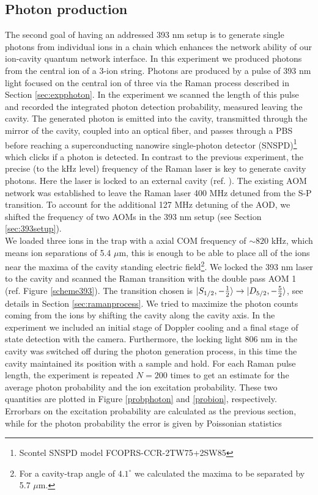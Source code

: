\subsection{Photon production}
\label{exp:photons}
The second goal of having an addressed 393 nm setup is to generate single photons from individual ions in a chain which enhances the network ability of our ion-cavity quantum network interface. In this experiment we produced photons from the central ion of a 3-ion string. Photons are produced by a pulse of 393 nm light focused on the central ion of three via the Raman process described in Section \ref{sec:expphoton}. In the experiment we scanned the length of this pulse and recorded the integrated photon detection probability, measured leaving the cavity. The generated photon is emitted into the cavity, transmitted through the mirror of the cavity, coupled into an optical fiber, and passes through a PBS before reaching a superconducting nanowire single-photon detector (SNSPD)\footnote{Scontel SNSPD model FCOPRS-CCR-2TW75+2SW85} which clicks if a photon is detected. In contrast to the previous experiment, the precise (to the kHz level) frequency of the Raman laser is key to generate cavity photons. Here the laser is locked to an external cavity (ref. \cite{helene}). The existing AOM network was established to leave the Raman laser 400 MHz detuned from the S-P transition. To account for the additional 127 MHz detuning of the AOD, we shifted the frequency of two AOMs in the 393 nm setup (see Section \ref{sec:393setup}).\\
We loaded three ions in the trap with a axial COM frequency of $\sim 820$ kHz, which means ion separations of 5.4 $\mu$m, this is enough to be able to place all of the ions near the maxima of the cavity standing electric field\footnote{For a cavity-trap angle of $4.1^\circ$ we calculated the maxima to be separated by 5.7 $\mu$m.}. We locked the 393 nm laser to the cavity and scanned the Raman transition with the double pass AOM 1 (ref. Figure \ref{scheme393}). The transition chosen is $\ket{S_{1/2},-\frac{1}{2}}\to \ket{D_{5/2},-\frac{5}{2}}$, see details in Section \ref{sec:ramanprocess}. We tried to maximize the photon counts coming from the ions by shifting the cavity along the cavity axis.
In the experiment we included an initial stage of Doppler cooling and a final stage of state detection with the camera. Furthermore, the locking light 806 nm in the cavity was switched off during the photon generation process, in this time the cavity maintained its position with a sample and hold. For each Raman pulse length, the experiment is repeated $N=200$ times to get an estimate for the average photon probability and the ion excitation probability. These two quantities are plotted in Figure \ref{probphoton} and \ref{probion}, respectively. Errorbars on the excitation probability are calculated as the previous section, while for the photon probability the error is given by Poissonian statistics \cite{quantumoptics}
